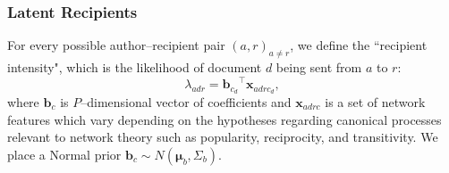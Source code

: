 \documentclass{article}
\begin{document}
\subsubsection{Latent Recipients}\label{subsubsec:Hypothetical Recipients}
For every possible author--recipient pair $(a,r)_{a \neq r}$, we define the ``recipient intensity", which is the likelihood of document $d$ being sent from $a$ to $r$:
\begin{equation}
\lambda_{adr} = {\boldsymbol{b}_{c_d}}^{\top}\boldsymbol{x}_{adrc_d},
\end{equation}
where $\boldsymbol{b}_c$ is $P$--dimensional vector of coefficients and $\boldsymbol{x}_{adrc}$ is a set of network features which vary depending on the hypotheses regarding canonical processes relevant to network theory such as popularity, reciprocity, and transitivity. We place a Normal prior $\boldsymbol{b}_c \sim N(\boldsymbol{\mu}_b, \Sigma_b)$.
\end{document}
